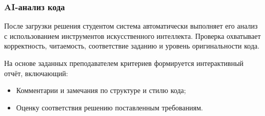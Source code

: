 \subsubsection{AI-анализ кода}
После загрузки решения студентом система автоматически выполняет его анализ с использованием инструментов искусственного интеллекта. Проверка охватывает корректность, читаемость, соответствие заданию и уровень оригинальности кода.

На основе заданных преподавателем критериев формируется интерактивный отчёт, включающий:
\begin{itemize}
  \item Комментарии и замечания по структуре и стилю кода;
  \item Оценку соответствия решению поставленным требованиям.
\end{itemize}
